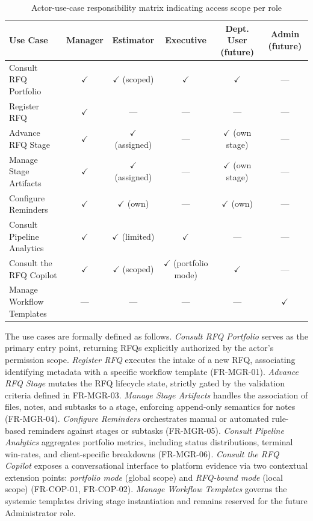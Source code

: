 \begin{table}[H]
\centering
\renewcommand{\arraystretch}{1.3}
\scriptsize
\begin{tabularx}{\textwidth}{|>{\RaggedRight\arraybackslash}X|c|c|c|c|c|}
\hline
\rowcolor{lightgray}
\textbf{Use Case} & \textbf{Manager} & \textbf{Estimator} & \textbf{Executive} & \textbf{Dept. User (future)} & \textbf{Admin (future)} \\ \hline
Consult RFQ Portfolio & $\checkmark$ & $\checkmark$ (scoped) & $\checkmark$ & $\checkmark$ & --- \\ \hline
Register RFQ & $\checkmark$ & --- & --- & --- & --- \\ \hline
Advance RFQ Stage & $\checkmark$ & $\checkmark$ (assigned) & --- & $\checkmark$ (own stage) & --- \\ \hline
Manage Stage Artifacts & $\checkmark$ & $\checkmark$ (assigned) & --- & $\checkmark$ (own stage) & --- \\ \hline
Configure Reminders & $\checkmark$ & $\checkmark$ (own) & --- & $\checkmark$ (own) & --- \\ \hline
Consult Pipeline Analytics & $\checkmark$ & $\checkmark$ (limited) & $\checkmark$ & --- & --- \\ \hline
Consult the RFQ Copilot & $\checkmark$ & $\checkmark$ (scoped) & $\checkmark$ (portfolio mode) & $\checkmark$ & --- \\ \hline
Manage Workflow Templates & --- & --- & --- & --- & $\checkmark$ \\ \hline
\end{tabularx}
\caption{Actor-use-case responsibility matrix indicating access scope per role}
\label{tab:use_case_matrix}
\end{table}

The use cases are formally defined as follows. \textit{Consult RFQ Portfolio} serves as the primary entry point, returning RFQs explicitly authorized by the actor's permission scope. \textit{Register RFQ} executes the intake of a new RFQ, associating identifying metadata with a specific workflow template (FR-MGR-01). \textit{Advance RFQ Stage} mutates the RFQ lifecycle state, strictly gated by the validation criteria defined in FR-MGR-03. \textit{Manage Stage Artifacts} handles the association of files, notes, and subtasks to a stage, enforcing append-only semantics for notes (FR-MGR-04). \textit{Configure Reminders} orchestrates manual or automated rule-based reminders against stages or subtasks (FR-MGR-05). \textit{Consult Pipeline Analytics} aggregates portfolio metrics, including status distributions, terminal win-rates, and client-specific breakdowns (FR-MGR-06). \textit{Consult the RFQ Copilot} exposes a conversational interface to platform evidence via two contextual extension points: \textit{portfolio mode} (global scope) and \textit{RFQ-bound mode} (local scope) (FR-COP-01, FR-COP-02). \textit{Manage Workflow Templates} governs the systemic templates driving stage instantiation and remains reserved for the future Administrator role.

